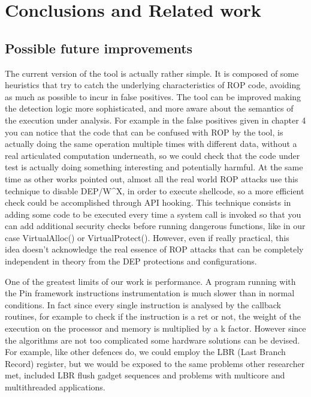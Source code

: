 \documentclass[Lau,binding=0.6cm]{sapthesis}
\begin{document}
\chapter{Conclusions and Related work}

\section{Possible future improvements}

The current version of the tool is actually rather simple. It is composed of some heuristics that try to catch the underlying characteristics of ROP code, avoiding as much as possible to incur in false positives. The tool can be improved making the detection logic more sophisticated, and more aware about the semantics of the execution under analysis. For example in the false positives given in chapter 4 you can notice that the code that can be confused with ROP by the tool, is actually doing the same operation multiple times with different data, without a real articulated computation underneath, so we could check that the code under test is actually doing something interesting and potentially harmful. At the same time as other works pointed out, almost all the real world ROP attacks use this technique to disable DEP/W\textasciicircum X, in order to execute shellcode, so a more efficient check could be accomplished through API hooking. This technique consists in adding some code to be executed every time a system call is invoked so that you can add additional security checks before running dangerous functions, like in our case VirtualAlloc() or VirtualProtect(). However, even if really practical, this idea doesn’t acknowledge the real essence of ROP attacks that can be completely independent in theory from the DEP protections and configurations.

One of the greatest limits of our work is performance. A program running with the Pin framework instructions instrumentation is much slower than in normal conditions. In fact since every single instruction is analysed by the callback routines, for example to check if the instruction is a ret or not, the weight of the execution on the processor and memory is multiplied by a k factor. However since the algorithms are not too complicated some hardware solutions can be devised. For example, like other defences do, we could employ the LBR (Last Branch Record) register, but we would be exposed to the same problems other researcher met, included LBR flush gadget sequences and problems with multicore and multithreaded applications.

\backmatter
\end{document}
